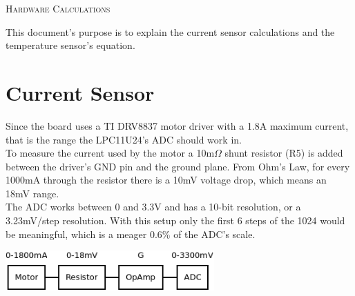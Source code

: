 \documentclass[11pt]{article}
\begin{document}
\thispagestyle{empty}

\begin{center}
 

\vspace{1.75cm}
\textsc{\Huge Hardware Calculations}

\end{center}

\bigskip \flushleft

This document's purpose is to explain the current sensor calculations and the temperature sensor's equation.

\section*{Current Sensor}
Since the board uses a TI DRV8837 motor driver with a 1.8A maximum current, that is the range the LPC11U24's ADC should work in.\\[0.25cm]

To measure the current used by the motor a  10m$\Omega$ shunt resistor (R5) is added between the driver's GND pin and the ground plane. From Ohm's Law, for every 1000mA through the resistor there is a 10mV voltage drop, which means an 18mV range.\\[0.25cm]

The ADC works between 0 and 3.3V and has a 10-bit resolution, or a 3.23mV/step resolution. With this setup only the first 6 steps of the 1024 would be meaningful, which is a meager 0.6\% of the ADC's scale. 

\vspace{0.5cm}
\begin{minipage}[]{\linewidth}%
\center \includegraphics[width=8cm]{./Dia/Diagram1.png}
\end{minipage}
\\[0.5cm]
\end{document}
